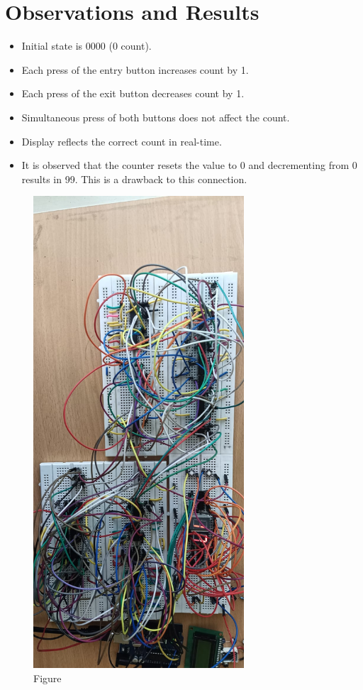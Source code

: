 \documentclass[a4paper,12pt]{article}
\begin{document}
\section{Observations and Results}
\begin{itemize}
    \item Initial state is 0000 (0 count).
    \item Each press of the entry button increases count by 1.
    \item Each press of the exit button decreases count by 1.
    \item Simultaneous press of both buttons does not affect the count.
    \item Display reflects the correct count in real-time.
    \item It is observed that the counter resets the value to 0 and decrementing from 0 results in 99. This is a drawback to this connection.
\end{itemize}

\begin{figure}[h]
    \centering
    \includegraphics[width=0.7\textwidth]{2.jpg} %
    \caption{Figure}
    \label{fig:example}
\end{figure}
\end{document}
